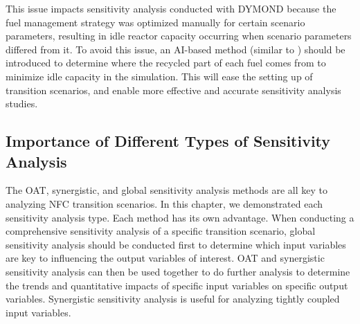 This issue impacts sensitivity analysis conducted 
with DYMOND because the fuel management strategy was 
optimized manually for certain scenario parameters, resulting in 
idle reactor capacity occurring when scenario parameters differed 
from it. 
To avoid this issue, an AI-based method (similar to \deploy) 
should be introduced to 
determine where the recycled part of each fuel comes from to 
minimize idle capacity in the simulation. 
This will ease the setting up of transition scenarios, and enable 
more effective and accurate sensitivity analysis studies.

\subsection{Importance of Different Types of Sensitivity Analysis}
The OAT, synergistic, and global sensitivity analysis methods 
are all key to analyzing \gls{NFC} transition scenarios. 
In this chapter, we demonstrated each sensitivity analysis type. 
Each method has its own advantage. 
When conducting a comprehensive sensitivity analysis of a specific 
transition scenario, 
global sensitivity analysis should be conducted first to 
determine which input variables are key to influencing the output 
variables of interest. 
OAT and synergistic sensitivity analysis can then be used together to 
do further analysis to determine the trends and quantitative impacts 
of specific input variables on specific output variables. 
Synergistic sensitivity analysis is useful for analyzing 
tightly coupled input variables.  
